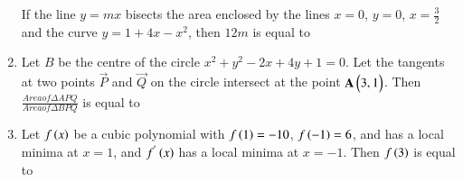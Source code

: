 \documentclass[journal]{IEEEtran}
\begin{document}
\begin{enumerate}
	If the line $y = mx$ bisects the area enclosed by the lines $x = 0$, $y = 0$, $x = \frac{3}{2}$ and the curve $y = 1 + 4x - x^{2}$, then $12m$ is equal to 
	\item 
	Let $B$ be the centre of the circle $x^2+ y^2 - 2x + 4y + 1 = 0$. Let the tangents at two points $\vec{P}$ and $\vec{Q}$ on the circle intersect at the point $\mathbf{A}\begin{pmatrix}3 , 1\end{pmatrix}$. Then $\frac{Area of \Delta APQ}{Area of \Delta BPQ}$ is equal to
	\item 
 	Let $f\left(x\right)$ be a cubic polynomial with $f\left(1\right) = -10$, $f\left(-1\right) = 6$, and has a local minima at $x = 1$, and $f^{'}\left(x\right)$ has a local minima at $x = -1$. Then $f\left(3\right)$ is equal to 
\end{enumerate}
\end{document}
